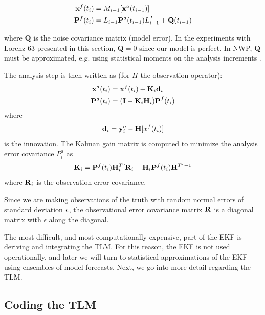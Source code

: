 \begin{align*} \mathbf{x}^f (t_i) &= M _{i-1} [\mathbf{x} ^a (t_{i-1} ) ]\\
\mathbf{P}^f (t_i ) &= L_{i-1} \mathbf{P}^a (t_{i-1} ) L^T _{i-1} + \mathbf{Q} (t_{i-1} ) \end{align*}

where $\mathbf{Q}$ is the noise covariance matrix (model error).
In the experiments with Lorenz 63 presented in this section, $\mathbf{Q} = 0$ since our model is perfect.
In NWP, $\mathbf{Q}$ must be approximated, e.g. using statistical moments on the analysis increments .

The analysis step is then written as (for $H$ the observation operator):
\begin{align} \mathbf{x}^a (t_i ) &= \mathbf{x}^f (t_i) + \mathbf{K}_i \mathbf{d}_i\\
\mathbf{P}^a (t_i) &= (\mathbf{I} - \mathbf{K}_i \mathbf{H}_i )\mathbf{P}^f (t_i) \end{align}
where
\[ \mathbf{d}_i = \mathbf{y}_i^o - \mathbf{H}[x^f (t_i) ] \]
is the innovation. The Kalman gain matrix is computed to minimize the analysis error covariance $P^a _i$ as
\[ \mathbf{K}_i = \mathbf{P}^f (t_i) \mathbf{H}_i ^T [ \mathbf{R}_i + \mathbf{H}_i \mathbf{P}^f (t_i) \mathbf{H}^T ] ^{-1} \]
where $\mathbf{R}_i$ is the observation error covariance.

Since we are making observations of the truth with random normal errors of standard deviation $\mathbf{\epsilon}$, the observational error covariance matrix $\mathbf{R}$ is a diagonal matrix with $\epsilon$ along the diagonal.

The most difficult, and most computationally expensive, part of the EKF is deriving and integrating the TLM.
For this reason, the EKF is not used operationally, and later we will turn to statistical approximations of the EKF using ensembles of model forecasts.
Next, we go into more detail regarding the TLM.

\subsection{Coding the TLM}

